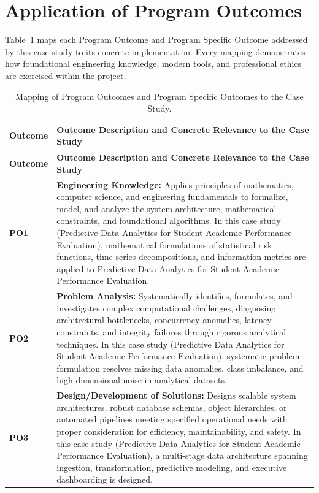 \section{Application of Program Outcomes}
Table~\ref{tab:po} maps each Program Outcome and Program Specific Outcome addressed by this case study to its concrete implementation. Every mapping demonstrates how foundational engineering knowledge, modern tools, and professional ethics are exercised within the project.

{\small
\begin{longtable}{@{}>{\centering\arraybackslash}p{1.8cm} p{13.2cm}@{}}
    \caption{Mapping of Program Outcomes and Program Specific Outcomes to the Case Study.}\label{tab:po}\\
    \toprule
    \textbf{Outcome} & \textbf{Outcome Description and Concrete Relevance to the Case Study} \\
    \midrule
    \endfirsthead
    \toprule
    \textbf{Outcome} & \textbf{Outcome Description and Concrete Relevance to the Case Study} \\
    \midrule
    \endhead
\textbf{PO1} & \textbf{Engineering Knowledge:} Applies principles of mathematics, computer science, and engineering fundamentals to formalize, model, and analyze the system architecture, mathematical constraints, and foundational algorithms. In this case study (Predictive Data Analytics for Student Academic Performance Evaluation), mathematical formulations of statistical risk functions, time-series decompositions, and information metrics are applied to Predictive Data Analytics for Student Academic Performance Evaluation. \\
    \addlinespace
\textbf{PO2} & \textbf{Problem Analysis:} Systematically identifies, formulates, and investigates complex computational challenges, diagnosing architectural bottlenecks, concurrency anomalies, latency constraints, and integrity failures through rigorous analytical techniques. In this case study (Predictive Data Analytics for Student Academic Performance Evaluation), systematic problem formulation resolves missing data anomalies, class imbalance, and high-dimensional noise in analytical datasets. \\
    \addlinespace
\textbf{PO3} & \textbf{Design/Development of Solutions:} Designs scalable system architectures, robust database schemas, object hierarchies, or automated pipelines meeting specified operational needs with proper consideration for efficiency, maintainability, and safety. In this case study (Predictive Data Analytics for Student Academic Performance Evaluation), a multi-stage data architecture spanning ingestion, transformation, predictive modeling, and executive dashboarding is designed. \\

\end{longtable}}
